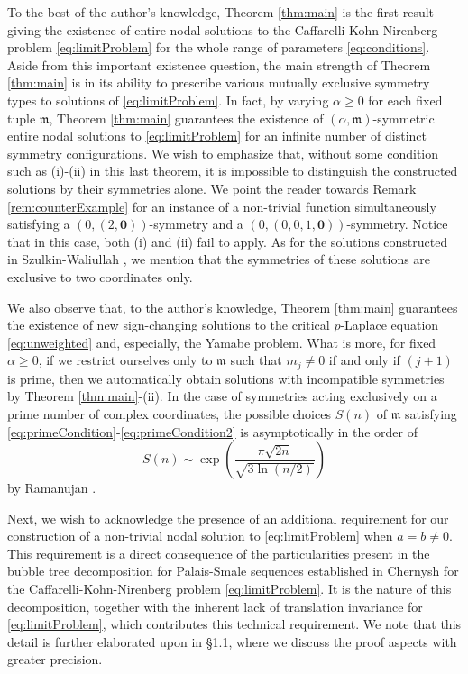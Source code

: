 \documentclass[10pt, reqno]{amsart}
\newcommand{\m}{\mathfrak{m}}
\numberwithin{equation}{section}
\theoremstyle{definition}
\theoremstyle{remark}
\theoremstyle{plain}
\begin{document}
	To the best of the author's knowledge, Theorem \ref{thm:main} is the first result giving the existence of entire nodal solutions to the Caffarelli-Kohn-Nirenberg problem \eqref{eq:limitProblem} for the whole range of parameters \eqref{eq:conditions}.
	Aside from this important existence question, the main strength of Theorem \ref{thm:main} is in its ability to prescribe various mutually exclusive symmetry types to solutions of \eqref{eq:limitProblem}. In fact, by varying $\alpha \ge 0$ for each fixed tuple $\m$, Theorem \ref{thm:main} guarantees the existence of $(\alpha,\m)$-symmetric entire nodal solutions to \eqref{eq:limitProblem} for an infinite number of distinct symmetry configurations. We wish to emphasize that, without some condition such as (i)-(ii) in this last theorem, it is impossible to distinguish the constructed solutions by their symmetries alone. We point the reader towards Remark \ref{rem:counterExample} for an instance of a non-trivial function simultaneously satisfying a $(0,(2,\mathbf{0}))$-symmetry and a $(0,(0,0,1,\mathbf{0}))$-symmetry. Notice that in this case, both (i) and (ii)  fail to apply. As for the solutions constructed in Szulkin-Waliullah \cite{szulkin2012sign}, we mention that the symmetries of these solutions are exclusive to two coordinates only.
	
	We also observe that, to the author's knowledge, Theorem \ref{thm:main} guarantees the existence of new sign-changing solutions to the critical $p$-Laplace equation \eqref{eq:unweighted} and, especially, the Yamabe problem. What is more, for fixed $\alpha \ge 0$, if we restrict ourselves only to $\m$ such that $m_j \ne 0$ if and only if $(j+1)$ is prime, then we automatically obtain solutions with incompatible symmetries by Theorem \ref{thm:main}-(ii). In the case of symmetries acting exclusively on a prime number of complex coordinates, the possible choices $S(n)$ of $\m$ satisfying \eqref{eq:primeCondition}-\eqref{eq:primeCondition2} is asymptotically in the order of 
	\[
	S(n) \sim \exp\left( \frac{\pi\sqrt{2n}}{\sqrt{3\ln(n/2)}}\right)
	\]
	by Ramanujan \cite[Page 260]{ramanujan2015collected}.
	
	Next, we wish to acknowledge the presence of an additional requirement for our construction of a non-trivial nodal solution to \eqref{eq:limitProblem} when $a=b \ne 0$. This requirement is a direct consequence of the particularities present in the bubble tree decomposition for Palais-Smale sequences established in Chernysh \cite{Chernysh} for the Caffarelli-Kohn-Nirenberg problem \eqref{eq:limitProblem}. It is the nature of this decomposition, together with the inherent lack of translation invariance for \eqref{eq:limitProblem}, which contributes this technical requirement. We note that this detail is further elaborated upon in \S1.1, where we discuss the proof aspects with greater precision. 
	
\end{document}
